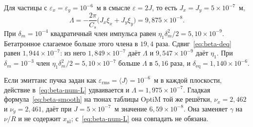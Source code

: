 Для частицы с $\varepsilon_x=\varepsilon_y=10^{-6}$~м в смысле $\varepsilon=2J$, то есть $J_x=J_y=5\times 10^{-7}$~м,
\begin{equation}
\label{eq:beta-num-L}
\Lambda
=-\frac{2\pi}{C_s}\bigl(J_x\xi_x+J_y\xi_y\bigr)
=9{,}875\times 10^{-8}.
\end{equation}
При $\delta_m=10^{-4}$ квадратичный член импульса равен $\eta_1\delta_m^2/2=5{,}10\times 10^{-9}$. Бетатронное слагаемое больше этого члена в $19{,}4$ раза. Сдвиг~\eqref{eq:beta-deq} равен $1{,}944\times 10^{-7}$: из него $1{,}849\times 10^{-7}$ даёт $\Lambda$ и $9{,}547\times 10^{-9}$ даёт $\eta_1$. При $\delta_m=10^{-3}$ член $\eta_1\delta_m^2/2=5{,}10\times 10^{-7}$ больше $\Lambda$ в $5{,}16$ раза, и $\delta_{\mathrm{eq}}=1{,}140\times 10^{-6}$.

Если эмиттанс пучка задан как $\varepsilon_{\mathrm{rms}}=\langle J\rangle=10^{-6}$~м в каждой плоскости, действие в~\eqref{eq:beta-num-L} удваивается и $\Lambda=1{,}975\times 10^{-7}$. Гладкая формула~\eqref{eq:beta-smooth} на тюнах таблицы OptiM той же решётки, $\nu_x=2{,}462$ и $\nu_y=2{,}461$, даёт при $J=5\times 10^{-7}$~м значение $6{,}59\times 10^{-8}$. Она заменяет $\gamma$ на $\nu/R$ и не содержит $x_{\mathrm{nl}}$; с~\eqref{eq:beta-num-L} она совпадать не обязана.
